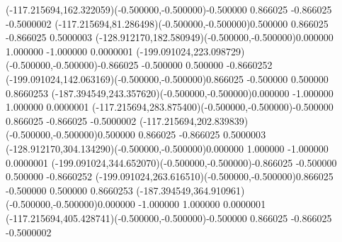 \color{ASYcolor}
\fontsize{12.000000}{14.400000}\selectfont
\ASYalignT(-117.215694,162.322059)(-0.500000,-0.500000){-0.500000 0.866025 -0.866025 -0.500000}{2}%
\color{ASYcolor}
\fontsize{12.000000}{14.400000}\selectfont
\ASYalignT(-117.215694,81.286498)(-0.500000,-0.500000){0.500000 0.866025 -0.866025 0.500000}{3}%
\color{ASYcolor}
\fontsize{12.000000}{14.400000}\selectfont
\ASYalignT(-128.912170,182.580949)(-0.500000,-0.500000){0.000000 1.000000 -1.000000 0.000000}{1}%
\color{ASYcolor}
\fontsize{12.000000}{14.400000}\selectfont
\ASYalignT(-199.091024,223.098729)(-0.500000,-0.500000){-0.866025 -0.500000 0.500000 -0.866025}{2}%
\color{ASYcolor}
\fontsize{12.000000}{14.400000}\selectfont
\ASYalignT(-199.091024,142.063169)(-0.500000,-0.500000){0.866025 -0.500000 0.500000 0.866025}{3}%
\color{ASYcolor}
\fontsize{12.000000}{14.400000}\selectfont
\ASYalignT(-187.394549,243.357620)(-0.500000,-0.500000){0.000000 -1.000000 1.000000 0.000000}{1}%
\color{ASYcolor}
\fontsize{12.000000}{14.400000}\selectfont
\ASYalignT(-117.215694,283.875400)(-0.500000,-0.500000){-0.500000 0.866025 -0.866025 -0.500000}{2}%
\color{ASYcolor}
\fontsize{12.000000}{14.400000}\selectfont
\ASYalignT(-117.215694,202.839839)(-0.500000,-0.500000){0.500000 0.866025 -0.866025 0.500000}{3}%
\color{ASYcolor}
\fontsize{12.000000}{14.400000}\selectfont
\ASYalignT(-128.912170,304.134290)(-0.500000,-0.500000){0.000000 1.000000 -1.000000 0.000000}{1}%
\color{ASYcolor}
\fontsize{12.000000}{14.400000}\selectfont
\ASYalignT(-199.091024,344.652070)(-0.500000,-0.500000){-0.866025 -0.500000 0.500000 -0.866025}{2}%
\color{ASYcolor}
\fontsize{12.000000}{14.400000}\selectfont
\ASYalignT(-199.091024,263.616510)(-0.500000,-0.500000){0.866025 -0.500000 0.500000 0.866025}{3}%
\color{ASYcolor}
\fontsize{12.000000}{14.400000}\selectfont
\ASYalignT(-187.394549,364.910961)(-0.500000,-0.500000){0.000000 -1.000000 1.000000 0.000000}{1}%
\color{ASYcolor}
\fontsize{12.000000}{14.400000}\selectfont
\ASYalignT(-117.215694,405.428741)(-0.500000,-0.500000){-0.500000 0.866025 -0.866025 -0.500000}{2}%
\color{ASYcolor}
